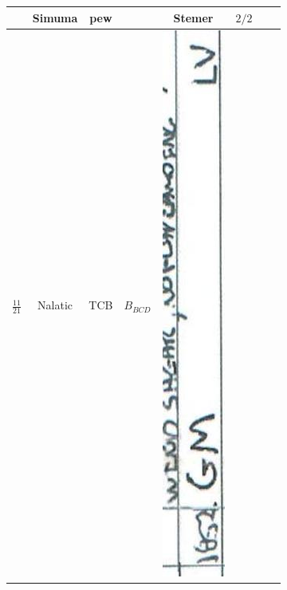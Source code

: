 \documentclass[10pt]{article}
\begin{document}
\begin{center}
\begin{tabular}{|c|c|c|c|c|c|c|c|}
 & Simuma & pew &  & Stemer & \(2 / 2\) &  &  \\
\hline
\(\frac{11}{21}\) & Nalatic & TCB & \(B_{B C D}\) & \includegraphics[max width=\textwidth]{2025_02_27_dd68c3d38de88f0516d9g-122(7)}

\end{tabular}
\end{center}
\end{document}
